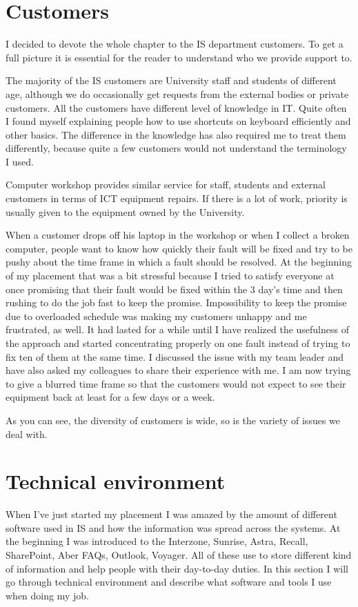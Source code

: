 \documentclass[10pt,a4paper,headinclude=true,twoside]{report}
\begin{document}
\chapter{Customers}
I decided to devote the whole chapter to the IS department customers. To get a full picture it is essential for the reader to understand who we provide support to.

The majority of the IS customers are University staff and students of different age, although we do occasionally get requests from the external bodies or private customers. All the customers have different level of knowledge in IT. Quite often I found myself explaining people how to use shortcuts on keyboard efficiently and other basics. The difference in the knowledge has also required me to treat them differently, because quite a few customers would not understand the terminology I used.  

Computer workshop provides similar service for staff, students and external customers in terms of ICT equipment repairs. If there is a lot of work, priority is usually given to the equipment owned by the University.

When a customer drops off his laptop in the workshop or when I collect a broken computer, people want to know how quickly their fault will be fixed and try to be pushy about the time frame in which a fault should be resolved. At the beginning of my placement that was a bit stressful because I tried to satisfy everyone at once promising that their fault would be fixed within the 3 day's time and then rushing to do the job fast to keep the promise. Impossibility to keep the promise due to overloaded schedule was making my customers unhappy and me frustrated, as well. It had lasted for a while until I have realized the usefulness of the approach and started concentrating properly on one fault instead of trying to fix ten of them at the same time. I discussed the issue with my team leader and have also asked my colleagues to share their experience with me. I am now trying to give a blurred time frame so that the customers would not expect to see their equipment back at least for a few days or a week. 

As you can see, the diversity of customers is wide, so is the variety of issues we deal with.

\chapter{Technical environment}
When I've just started my placement I was amazed by the amount of different software used in IS and how the information was spread across the systems. At the beginning I was introduced to the Interzone, Sunrise, Astra, Recall, SharePoint, Aber FAQs, Outlook, Voyager. All of these use to store different kind of information and help people with their day-to-day duties. In this section I will go through technical environment and describe what software and tools I use when doing my job.
  
\end{document}
